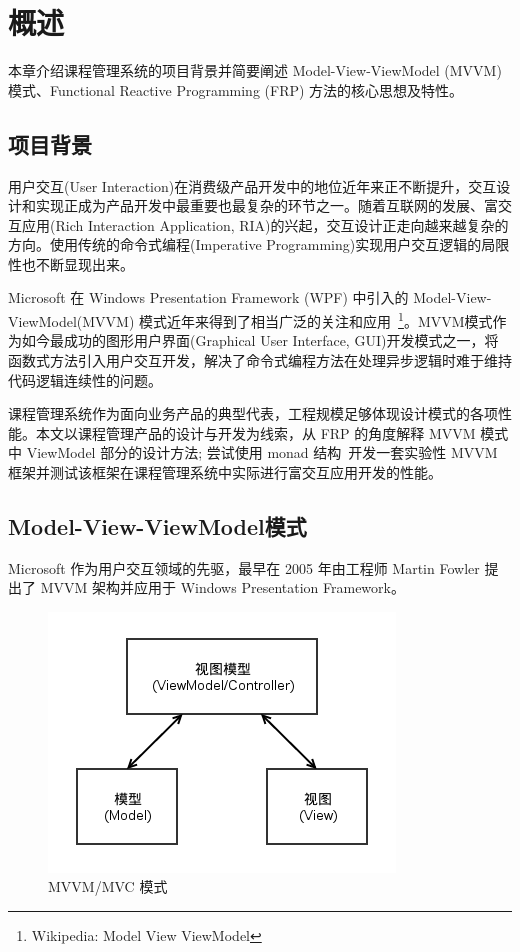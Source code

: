 \chapter{概述}

本章介绍课程管理系统的项目背景并简要阐述 Model-View-ViewModel (MVVM) 模式、Functional Reactive Programming (FRP) 方法的核心思想及特性。

\section{项目背景}

用户交互(User Interaction)在消费级产品开发中的地位近年来正不断提升，交互设计和实现正成为产品开发中最重要也最复杂的环节之一。随着互联网的发展、富交互应用(Rich Interaction Application, RIA)的兴起，交互设计正走向越来越复杂的方向。使用传统的命令式编程(Imperative Programming)实现用户交互逻辑的局限性也不断显现出来。

Microsoft 在 Windows Presentation Framework (WPF) 中引入的 Model-View-ViewModel(MVVM) 模式近年来得到了相当广泛的关注和应用~\footnote{Wikipedia: Model View ViewModel}。MVVM模式作为如今最成功的图形用户界面(Graphical User Interface, GUI)开发模式之一，将函数式方法引入用户交互开发，解决了命令式编程方法在处理异步逻辑时难于维持代码逻辑连续性的问题。

课程管理系统作为面向业务产品的典型代表，工程规模足够体现设计模式的各项性能。本文以课程管理产品的设计与开发为线索，从 FRP 的角度解释 MVVM 模式中 ViewModel 部分的设计方法; 尝试使用 monad 结构~\cite{raey}开发一套实验性 MVVM 框架并测试该框架在课程管理系统中实际进行富交互应用开发的性能。

\newpage

\section{Model-View-ViewModel模式}

Microsoft 作为用户交互领域的先驱，最早在 2005 年由工程师 Martin Fowler 提出了 MVVM 架构并应用于 Windows Presentation Framework。

\begin{figure}[!hbp]
\begin{center}
\includegraphics[scale=0.5]{figures/MVVMOverview.png}
\caption{MVVM/MVC 模式\label{MVVMOverview}}
\end{center}
\end{figure}

